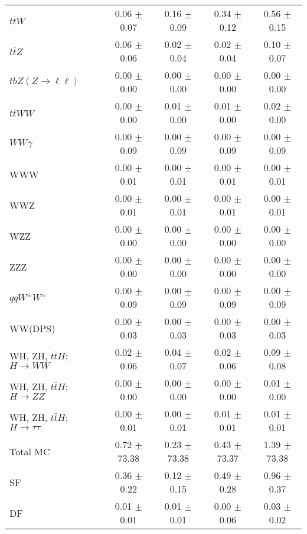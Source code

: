 \begin{tabular}{l|cccc}
                   $t\overline{t}W$ &  0.06 $\pm$  0.07 &  0.16 $\pm$  0.09 &  0.34 $\pm$  0.12 &  0.56 $\pm$  0.15 \\
                   $t\overline{t}Z$ &  0.06 $\pm$  0.06 &  0.02 $\pm$  0.04 &  0.02 $\pm$  0.04 &  0.10 $\pm$  0.07 \\
    $tbZ (Z \rightarrow \ell \ell)$ &  0.00 $\pm$  0.00 &  0.00 $\pm$  0.00 &  0.00 $\pm$  0.00 &  0.00 $\pm$  0.00 \\
                  $t\overline{t}WW$ &  0.00 $\pm$  0.00 &  0.01 $\pm$  0.00 &  0.01 $\pm$  0.00 &  0.02 $\pm$  0.00 \\
                         $WW\gamma$ &  0.00 $\pm$  0.09 &  0.00 $\pm$  0.09 &  0.00 $\pm$  0.09 &  0.00 $\pm$  0.09 \\
                                WWW &  0.00 $\pm$  0.01 &  0.00 $\pm$  0.01 &  0.00 $\pm$  0.01 &  0.00 $\pm$  0.01 \\
                                WWZ &  0.00 $\pm$  0.01 &  0.00 $\pm$  0.01 &  0.00 $\pm$  0.01 &  0.00 $\pm$  0.01 \\
                                WZZ &  0.00 $\pm$  0.00 &  0.00 $\pm$  0.00 &  0.00 $\pm$  0.00 &  0.00 $\pm$  0.00 \\
                                ZZZ &  0.00 $\pm$  0.00 &  0.00 $\pm$  0.00 &  0.00 $\pm$  0.00 &  0.00 $\pm$  0.00 \\
                 $qqW^{\pm}W^{\pm}$ &  0.00 $\pm$  0.09 &  0.00 $\pm$  0.09 &  0.00 $\pm$  0.09 &  0.00 $\pm$  0.09 \\
                            WW(DPS) &  0.00 $\pm$  0.03 &  0.00 $\pm$  0.03 &  0.00 $\pm$  0.03 &  0.00 $\pm$  0.03 \\
WH, ZH, $t\bar{t}H$; $H \rightarrow WW$ &  0.02 $\pm$  0.06 &  0.04 $\pm$  0.07 &  0.02 $\pm$  0.06 &  0.09 $\pm$  0.08 \\
WH, ZH, $t\bar{t}H$; $H \rightarrow ZZ$ &  0.00 $\pm$  0.00 &  0.00 $\pm$  0.00 &  0.00 $\pm$  0.00 &  0.01 $\pm$  0.00 \\
WH, ZH, $t\bar{t}H$; $H \rightarrow \tau\tau$ &  0.00 $\pm$  0.01 &  0.00 $\pm$  0.01 &  0.01 $\pm$  0.01 &  0.01 $\pm$  0.01 \\
\hline\hline
                           Total MC &  0.72 $\pm$ 73.38 &  0.23 $\pm$ 73.38 &  0.43 $\pm$ 73.37 &  1.39 $\pm$ 73.38 \\
\hline
                                 SF &  0.36 $\pm$  0.22 &  0.12 $\pm$  0.15 &  0.49 $\pm$  0.28 &  0.96 $\pm$  0.37 \\
                                 DF &  0.01 $\pm$  0.01 &  0.01 $\pm$  0.01 &  0.00 $\pm$  0.06 &  0.03 $\pm$  0.02 \\

\end{tabular}
